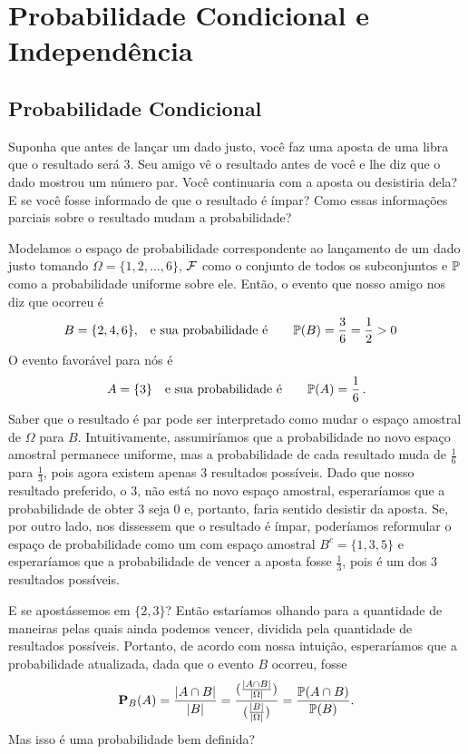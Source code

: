 


\clearpage
\section{Probabilidade Condicional e Independência}

\subsection{Probabilidade Condicional}

\begin{example}
Suponha que antes de lançar um dado justo, você faz uma aposta de uma libra que o resultado será $3$. Seu amigo vê o resultado antes de você e lhe diz que o dado mostrou um número par. Você continuaria com a aposta ou desistiria dela? E se você fosse informado de que o resultado é ímpar? Como essas informações parciais sobre o resultado mudam a probabilidade?

Modelamos o espaço de probabilidade correspondente ao lançamento de um dado justo tomando 
$\Omega = \{1,2,\dots,6\}$, $\mathcal F$ como o conjunto de todos os subconjuntos e $\mathbb{P}$ como a probabilidade uniforme sobre ele. Então, o evento que nosso amigo nos diz que ocorreu é 
\begin{align}
B=\{2,4,6\}, &\quad\text{e sua probabilidade é} \qquad \mathbb{P}(B)= \frac{3}{6}=\frac{1}{2} >0 
\end{align}
O evento favorável para nós é 
\[
A=\{3\}\quad\text{e sua probabilidade é} \qquad \mathbb{P}(A)= \frac{1}{6}\,.
\]
Saber que o resultado é par pode ser interpretado como mudar o espaço amostral de $\Omega$ para $B$. Intuitivamente, assumiríamos que a probabilidade no novo espaço amostral permanece uniforme, mas a probabilidade de cada resultado muda de $\frac{1}{6}$ para $\frac{1}{3}$, pois agora existem apenas $3$ resultados possíveis. Dado que nosso resultado preferido, o $3$, não está no novo espaço amostral, esperaríamos que a probabilidade de obter $3$ seja $0$ e, portanto, faria sentido desistir da aposta. Se, por outro lado, nos dissessem que o resultado é ímpar, poderíamos reformular o espaço de probabilidade como um com espaço amostral $B^c=\{1,3,5\}$ e esperaríamos que a probabilidade de vencer a aposta fosse $\frac{1}{3}$, pois é um dos $3$ resultados possíveis.

E se apostássemos em $\{2,3\}$? Então estaríamos olhando para a quantidade de maneiras pelas quais ainda podemos vencer, dividida pela quantidade de resultados possíveis. Portanto, de acordo com nossa intuição, esperaríamos que a probabilidade atualizada, dada que o evento $B$ ocorreu, fosse 
\[ \mathbf{P}_B(A) = \frac{|A\cap B|}{|B|} = \frac{(\frac{|A\cap B|}{|\Omega|})}{(\frac{|B|}{|\Omega|})}=\frac{\mathbb{P}(A\cap B)}{\mathbb{P}(B)}.\] 
Mas isso é uma probabilidade bem definida?
\end{example}

